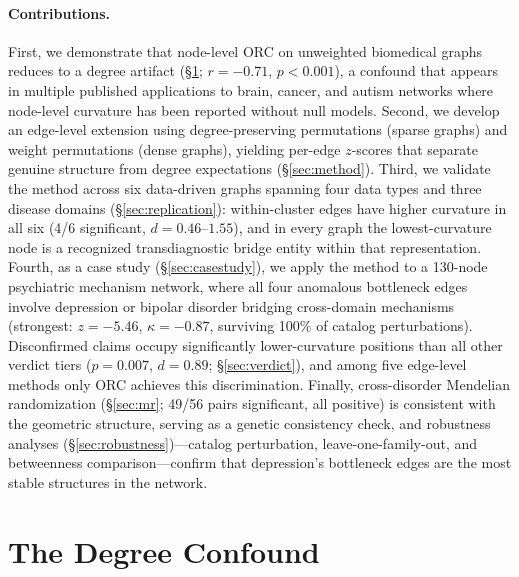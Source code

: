 \documentclass[11pt]{article}
\begin{document}
\paragraph{Contributions.}
First, we demonstrate that node-level ORC on unweighted biomedical graphs reduces to a degree artifact (\S\ref{sec:degree}; $r = -0.71$, $p < 0.001$), a confound that appears in multiple published applications to brain, cancer, and autism networks where node-level curvature has been reported without null models. Second, we develop an edge-level extension using degree-preserving permutations (sparse graphs) and weight permutations (dense graphs), yielding per-edge $z$-scores that separate genuine structure from degree expectations (\S\ref{sec:method}). Third, we validate the method across six data-driven graphs spanning four data types and three disease domains (\S\ref{sec:replication}): within-cluster edges have higher curvature in all six (4/6 significant, $d = 0.46$--$1.55$), and in every graph the lowest-curvature node is a recognized transdiagnostic bridge entity within that representation. Fourth, as a case study (\S\ref{sec:casestudy}), we apply the method to a 130-node psychiatric mechanism network, where all four anomalous bottleneck edges involve depression or bipolar disorder bridging cross-domain mechanisms (strongest: $z = -5.46$, $\kappa = -0.87$, surviving 100\% of catalog perturbations). Disconfirmed claims occupy significantly lower-curvature positions than all other verdict tiers ($p = 0.007$, $d = 0.89$; \S\ref{sec:verdict}), and among five edge-level methods only ORC achieves this discrimination. Finally, cross-disorder Mendelian randomization (\S\ref{sec:mr}; 49/56 pairs significant, all positive) is consistent with the geometric structure, serving as a genetic consistency check, and robustness analyses (\S\ref{sec:robustness})---catalog perturbation, leave-one-family-out, and betweenness comparison---confirm that depression's bottleneck edges are the most stable structures in the network.

\section{The Degree Confound}
\label{sec:degree}
\end{document}
